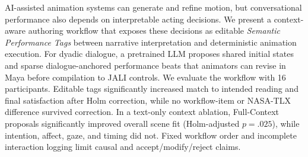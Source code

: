 AI-assisted animation systems can generate and refine motion, but conversational performance also depends on interpretable acting decisions. We present a context-aware authoring workflow that exposes these decisions as editable \textit{Semantic Performance Tags} between narrative interpretation and deterministic animation execution. For dyadic dialogue, a pretrained LLM proposes shared initial states and sparse dialogue-anchored performance beats that animators can revise in Maya before compilation to JALI controls. We evaluate the workflow with 16 participants. Editable tags significantly increased match to intended reading and final satisfaction after Holm correction, while no workflow-item or NASA-TLX difference survived correction. In a text-only context ablation, Full-Context proposals significantly improved overall scene fit (Holm-adjusted $p=.025$), while intention, affect, gaze, and timing did not. Fixed workflow order and incomplete interaction logging limit causal and accept/modify/reject claims.
